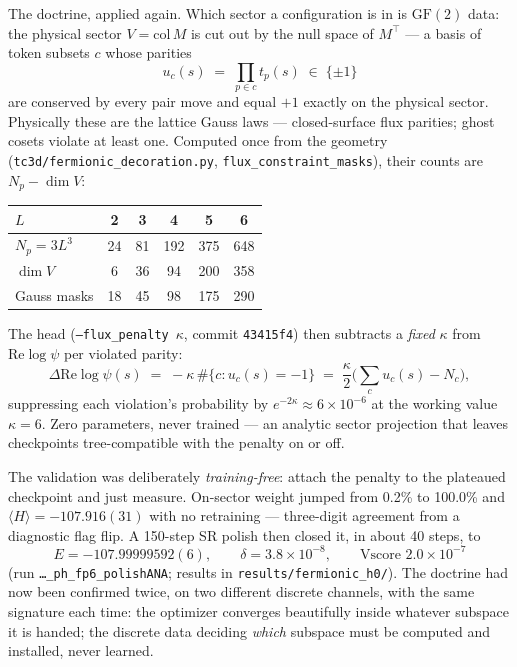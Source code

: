\documentclass[11pt]{article}
\newcommand{\GF}{\mathrm{GF}(2)}
\newcommand{\file}[1]{\texttt{#1}}
\begin{document}
The doctrine, applied again. Which sector a configuration is in is $\GF$
data: the physical sector $V=\mathrm{col}\,M$ is cut out by the null space of
$M^{\!\top}$ --- a basis of token subsets $c$ whose parities
\begin{equation}
u_c(s) \;=\; \prod_{p\in c} t_p(s) \;\in\;\{\pm1\}
\label{eq:gausslaw}
\end{equation}
are conserved by every pair move and equal $+1$ exactly on the physical
sector. Physically these are the lattice Gauss laws --- closed-surface flux
parities; ghost cosets violate at least one. Computed once from the geometry
(\file{tc3d/fermionic\_decoration.py}, \texttt{flux\_constraint\_masks}),
their counts are $N_p-\dim V$:
\begin{center}
\begin{tabular}{@{}lccccc@{}}
\toprule
$L$ & 2 & 3 & 4 & 5 & 6\\
\midrule
$N_p=3L^3$ & 24 & 81 & 192 & 375 & 648\\
$\dim V$ & 6 & 36 & 94 & 200 & 358\\
Gauss masks & 18 & 45 & 98 & 175 & 290\\
\bottomrule
\end{tabular}
\end{center}
The head (\texttt{--flux\_penalty}~$\kappa$, commit \texttt{43415f4}) then
subtracts a \emph{fixed} $\kappa$ from $\mathrm{Re}\log\psi$ per violated
parity:
\begin{equation}
\Delta \mathrm{Re}\log\psi(s) \;=\; -\kappa\,\#\{c : u_c(s)=-1\}
\;=\;\frac{\kappa}{2}\Big(\sum_c u_c(s) - N_c\Big),
\label{eq:penalty}
\end{equation}
suppressing each violation's probability by $e^{-2\kappa}\approx
6\times10^{-6}$ at the working value $\kappa=6$. Zero parameters, never
trained --- an analytic sector projection that leaves checkpoints
tree-compatible with the penalty on or off.

The validation was deliberately \emph{training-free}: attach the penalty to
the plateaued checkpoint and just measure. On-sector weight jumped from 0.2\%
to 100.0\% and $\langle H\rangle=-107.916(31)$ with no retraining ---
three-digit agreement from a diagnostic flag flip. A 150-step SR polish then
closed it, in about 40 steps, to
\[
E=-107.99999592(6),\qquad \delta=3.8\times10^{-8},\qquad
\text{Vscore } 2.0\times10^{-7}
\]
(run \texttt{\dots\_ph\_fp6\_polishANA}; results in
\file{results/fermionic\_h0/}). The doctrine had now been confirmed twice, on
two different discrete channels, with the same signature each time: the
optimizer converges beautifully inside whatever subspace it is handed; the
discrete data deciding \emph{which} subspace must be computed and installed,
never learned.
\end{document}
